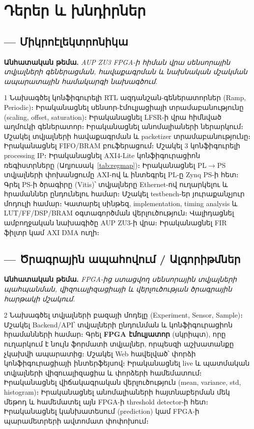 \chapter{Դերեր և խնդիրներ}
\label{ch:tasks}

\section{ — Միկրոէլեկտրոնիկա}
\textbf{Անհատական թեմա.} \emph{AUP ZU3 FPGA-ի հիման վրա սենսորային տվյալների գեներացման,
հավաքագրման և նախնական մշակման ապարատային համակարգի նախագծում.}

\begin{tasklist}{1}
  \task Նախագծել կոնֆիգուրելի RTL ազդանշան-գեներատորներ (Ramp, Periodic)։
  \task Իրականացնել սենսոր-էմուլյացիայի տրամաբանությունը (scaling, offset, saturation)։
  \task Իրականացնել LFSR-ի վրա հիմնված աղմուկի գեներատոր։
  \task Իրականացնել անոմալիաների ներարկում։
  \task Մշակել տվյալների հավաքագրման և packetizer տրամաբանությունը։
  \task Իրականացնել FIFO/BRAM բուֆերացում։
  \task Մշակել 3 կոնֆիգուրելի processing IP։
  \task Իրականացնել AXI4-Lite կոնֆիգուրացիոն ռեգիստրները (Աղյուսակ~\ref{tab:regmap})։
  \task Իրականացնել PL$\rightarrow$PS տվյալների փոխանցումը AXI-ով և ինտեգրել PL-ը Zynq PS-ի հետ։
  \task Գրել PS-ի ծրագիրը (Vitis)՝ տվյալները Ethernet-ով ուղարկելու և հրամաններ ընդունելու համար։
  \task Մշակել testbench-եր յուրաքանչյուր մոդուլի համար։
  \task Կատարել սինթեզ, implementation, timing analysis և LUT/FF/DSP/BRAM օգտագործման վերլուծություն։
  \task Վալիդացնել ամբողջական նախագիծը AUP ZU3-ի վրա։
  \task \optionaltask Իրականացնել FIR ֆիլտր կամ AXI DMA ուղի։
\end{tasklist}


\section{ — Ծրագրային ապահովում / Ալգորիթմներ}
\textbf{Անհատական թեմա.} \emph{FPGA-ից ստացվող սենսորային տվյալների պահպանման,
վիզուալիզացիայի և վերլուծության ծրագրային հարթակի մշակում.}

\begin{tasklist}{2}
  \task Նախագծել տվյալների բազայի մոդելը (Experiment, Sensor, Sample)։
  \task Մշակել Backend/API՝ տվյալների ընդունման և կոնֆիգուրացիոն հրամանների համար։
  \task Գրել \textbf{FPGA էմուլյատոր} (սկրիպտ), որը ուղարկում է նույն ֆորմատի տվյալներ, որպեսզի աշխատանքը չկախվի ապարատից։
  \task Մշակել Web հավելված՝ փորձի կոնֆիգուրացիայի ինտերֆեյսով։
  \task Իրականացնել live և պատմական տվյալների վիզուալիզացիա և փորձերի համեմատում։
  \task Իրականացնել վիճակագրական վերլուծություն (mean, variance, std, histogram)։
  \task Իրականացնել անոմալիաների հայտնաբերման մեկ մեթոդ և համեմատել այն FPGA-ի threshold detector-ի հետ։
  \task \optionaltask Իրականացնել կանխատեսում (prediction) կամ FPGA-ի պարամետրերի ավտոմատ փոփոխում։
\end{tasklist}

